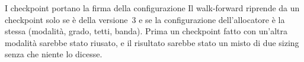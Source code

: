 \begin{attenzione}{I checkpoint portano la firma della configurazione}
Il walk-forward riprende da un checkpoint solo se è della versione~3 e se la
configurazione dell'allocatore è la stessa (modalità, grado, tetti, banda).
Prima un checkpoint fatto con un'altra modalità sarebbe stato riusato, e il
risultato sarebbe stato un misto di due sizing senza che niente lo dicesse.
\end{attenzione}

